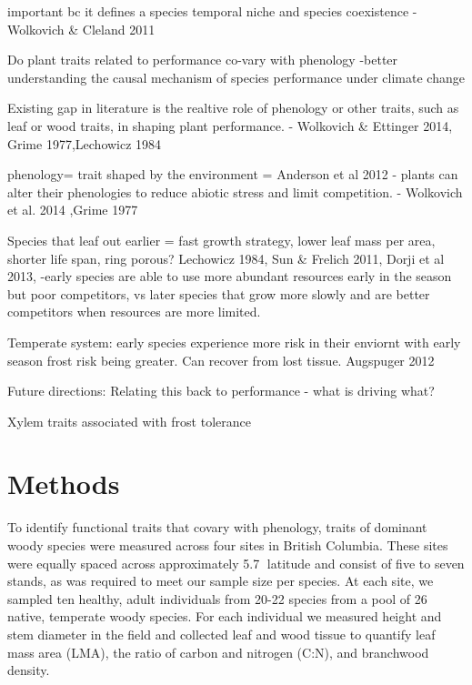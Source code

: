 \documentclass{article}\usepackage[]{graphicx}\usepackage[]{color}
\begin{document}
important bc it defines a species temporal niche and species coexistence - Wolkovich & Cleland 2011

Do plant traits related to performance co-vary with phenology
-better understanding the causal mechanism of species performance under climate change

Existing gap in literature is the realtive role of phenology or other traits, such as leaf or wood traits, in shaping plant performance. - Wolkovich & Ettinger 2014, Grime 1977,Lechowicz 1984

phenology= trait shaped by the environment =  Anderson et al 2012
- plants can alter their phenologies to reduce abiotic stress and limit competition. - Wolkovich et al. 2014 ,Grime 1977

Species that leaf out earlier = fast growth strategy, lower leaf mass per area, shorter life span, ring porous? Lechowicz 1984, Sun & Frelich 2011, Dorji et al 2013, 
-early species are able to use more abundant resources early in the season but poor competitors, vs later species that grow more slowly and are better competitors when resources are more limited. 

Temperate system: early species experience more risk in their enviornt with early season frost risk being greater. Can recover from lost tissue. Augspuger 2012

Future directions: 
Relating this back to performance - what is driving what?

Xylem traits associated with frost tolerance \cite{Lechowicz1984}


\section*{Methods}
\par To identify functional traits that covary with phenology, traits of dominant woody species were measured across four sites in British Columbia. These sites were equally spaced across approximately 5.7 latitude and consist of five to seven stands, as was required to meet our sample size per species.  At each site, we sampled ten healthy, adult individuals from 20-22 species from a pool of 26 native, temperate woody species. For each individual we measured height and stem diameter in the field and collected leaf and wood tissue to quantify leaf mass area (LMA), the ratio of carbon and nitrogen (C:N), and branchwood density. 
\end{document}
